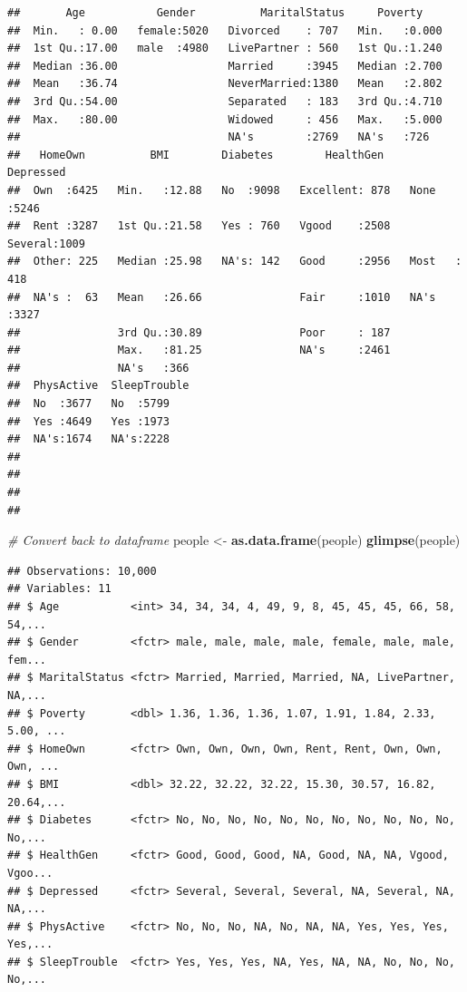 \documentclass[]{article}
\newenvironment{Shaded}{\begin{snugshade}}{\end{snugshade}}
\newcommand{\KeywordTok}[1]{\textcolor[rgb]{0.13,0.29,0.53}{\textbf{{#1}}}}
\newcommand{\StringTok}[1]{\textcolor[rgb]{0.31,0.60,0.02}{{#1}}}
\newcommand{\CommentTok}[1]{\textcolor[rgb]{0.56,0.35,0.01}{\textit{{#1}}}}
\newcommand{\NormalTok}[1]{{#1}}
\begin{document}
\begin{verbatim}
##       Age           Gender          MaritalStatus     Poverty     
##  Min.   : 0.00   female:5020   Divorced    : 707   Min.   :0.000  
##  1st Qu.:17.00   male  :4980   LivePartner : 560   1st Qu.:1.240  
##  Median :36.00                 Married     :3945   Median :2.700  
##  Mean   :36.74                 NeverMarried:1380   Mean   :2.802  
##  3rd Qu.:54.00                 Separated   : 183   3rd Qu.:4.710  
##  Max.   :80.00                 Widowed     : 456   Max.   :5.000  
##                                NA's        :2769   NA's   :726    
##   HomeOwn          BMI        Diabetes        HealthGen      Depressed   
##  Own  :6425   Min.   :12.88   No  :9098   Excellent: 878   None   :5246  
##  Rent :3287   1st Qu.:21.58   Yes : 760   Vgood    :2508   Several:1009  
##  Other: 225   Median :25.98   NA's: 142   Good     :2956   Most   : 418  
##  NA's :  63   Mean   :26.66               Fair     :1010   NA's   :3327  
##               3rd Qu.:30.89               Poor     : 187                 
##               Max.   :81.25               NA's     :2461                 
##               NA's   :366                                                
##  PhysActive  SleepTrouble
##  No  :3677   No  :5799   
##  Yes :4649   Yes :1973   
##  NA's:1674   NA's:2228   
##                          
##                          
##                          
## 
\end{verbatim}

\begin{Shaded}
\begin{Highlighting}[]
\CommentTok{# Convert back to dataframe}
\NormalTok{people <-}\StringTok{ }\KeywordTok{as.data.frame}\NormalTok{(people)}
\KeywordTok{glimpse}\NormalTok{(people)}
\end{Highlighting}
\end{Shaded}

\begin{verbatim}
## Observations: 10,000
## Variables: 11
## $ Age           <int> 34, 34, 34, 4, 49, 9, 8, 45, 45, 45, 66, 58, 54,...
## $ Gender        <fctr> male, male, male, male, female, male, male, fem...
## $ MaritalStatus <fctr> Married, Married, Married, NA, LivePartner, NA,...
## $ Poverty       <dbl> 1.36, 1.36, 1.36, 1.07, 1.91, 1.84, 2.33, 5.00, ...
## $ HomeOwn       <fctr> Own, Own, Own, Own, Rent, Rent, Own, Own, Own, ...
## $ BMI           <dbl> 32.22, 32.22, 32.22, 15.30, 30.57, 16.82, 20.64,...
## $ Diabetes      <fctr> No, No, No, No, No, No, No, No, No, No, No, No,...
## $ HealthGen     <fctr> Good, Good, Good, NA, Good, NA, NA, Vgood, Vgoo...
## $ Depressed     <fctr> Several, Several, Several, NA, Several, NA, NA,...
## $ PhysActive    <fctr> No, No, No, NA, No, NA, NA, Yes, Yes, Yes, Yes,...
## $ SleepTrouble  <fctr> Yes, Yes, Yes, NA, Yes, NA, NA, No, No, No, No,...
\end{verbatim}
\end{document}
